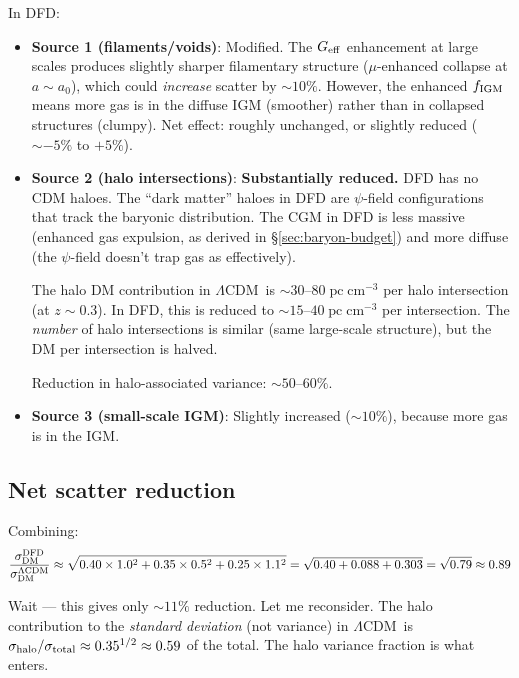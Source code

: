 \documentclass[11pt]{article}
\newcommand{\LCDM}{$\Lambda$CDM}
\newcommand{\fIGM}{f_{\rm IGM}}
\newcommand{\Geff}{G_{\rm eff}}
\newcommand{\pc}{\;\mathrm{pc\;cm}^{-3}}
\begin{document}
In DFD:
\begin{itemize}
\item \textbf{Source 1 (filaments/voids)}: Modified.  The $\Geff$
  enhancement at large scales produces slightly sharper filamentary
  structure ($\mu$-enhanced collapse at $a \sim a_0$), which could
  \emph{increase} scatter by $\sim 10\%$.  However, the enhanced
  $\fIGM$ means more gas is in the diffuse IGM (smoother) rather
  than in collapsed structures (clumpy).  Net effect: roughly
  unchanged, or slightly reduced ($\sim -5\%$ to $+5\%$).

\item \textbf{Source 2 (halo intersections)}: \textbf{Substantially
  reduced.}  DFD has no CDM haloes.  The ``dark matter'' haloes in
  DFD are $\psi$-field configurations that track the baryonic
  distribution.  The CGM in DFD is less massive (enhanced gas
  expulsion, as derived in \S\ref{sec:baryon-budget}) and more
  diffuse (the $\psi$-field doesn't trap gas as effectively).

  The halo DM contribution in \LCDM\ is $\sim 30$--$80\pc$ per
  halo intersection (at $z \sim 0.3$).  In DFD, this is reduced to
  $\sim 15$--$40\pc$ per intersection.  The \emph{number} of halo
  intersections is similar (same large-scale structure), but the
  DM per intersection is halved.

  Reduction in halo-associated variance: $\sim 50$--$60\%$.

\item \textbf{Source 3 (small-scale IGM)}: Slightly increased
  ($\sim 10\%$), because more gas is in the IGM.
\end{itemize}

\subsection{Net scatter reduction}

Combining:
\begin{equation}
\frac{\sigma_{\rm DM}^{\rm DFD}}{\sigma_{\rm DM}^{\rm \Lambda CDM}}
\approx \sqrt{0.40 \times 1.0^2 + 0.35 \times 0.5^2 + 0.25 \times 1.1^2}
= \sqrt{0.40 + 0.088 + 0.303}
= \sqrt{0.79}
\approx 0.89
\end{equation}

Wait --- this gives only $\sim 11\%$ reduction.  Let me reconsider.
The halo contribution to the \emph{standard deviation} (not variance)
in \LCDM\ is $\sigma_{\rm halo}/\sigma_{\rm total} \approx 0.35^{1/2}
\approx 0.59$ of the total.  The halo variance fraction is what enters.
\end{document}
